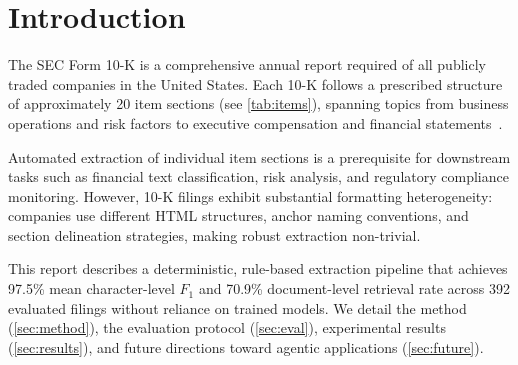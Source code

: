 \documentclass[12pt,letterpaper,oneside]{article}
\begin{document}
\makeCustomTitle
\thispagestyle{titlePage}

\begin{abstract}
We present a rule-based pipeline for extracting standardized item
sections from SEC 10-K filings. The method exploits the anchor-link
structure of the HTML Table of Contents to identify section boundaries,
classifies anchors via a three-tier regex hierarchy, and resolves
ordering conflicts through a dynamic programming formulation of the
weighted longest increasing subsequence problem. On a corpus of 392
annotated filings across three evaluation sets, the pipeline achieves
a mean character-level $F_1$ score of \textbf{97.5\%} and a
document-level retrieval rate of \textbf{70.9\%} (278/392), where a
document is ``retrieved'' only when every ground truth item is present,
no false positives exist, and all item boundaries exceed $F_1 \geq 0.9$.
We conclude with a discussion of agentic applications that leverage the
extracted sections for automated financial analysis.
\end{abstract}

\tableofcontents
\newpage

\section{Introduction}\label{sec:intro}

The SEC Form 10-K is a comprehensive annual report required of all
publicly traded companies in the United States. Each 10-K follows a
prescribed structure of approximately 20 item sections
(see \autoref{tab:items}), spanning topics from business operations
and risk factors to executive compensation and financial
statements~\cite{zhang2023form10k}.

Automated extraction of individual item sections is a prerequisite
for downstream tasks such as financial text classification, risk
analysis, and regulatory compliance monitoring. However, 10-K filings
exhibit substantial formatting heterogeneity: companies use different
HTML structures, anchor naming conventions, and section delineation
strategies, making robust extraction non-trivial.

This report describes a deterministic, rule-based extraction pipeline
that achieves 97.5\% mean character-level $F_1$ and 70.9\%
document-level retrieval rate across 392 evaluated filings without
reliance on trained models. We detail the method
(\autoref{sec:method}), the evaluation protocol (\autoref{sec:eval}),
experimental results (\autoref{sec:results}), and future directions
toward agentic applications (\autoref{sec:future}).
\end{document}
